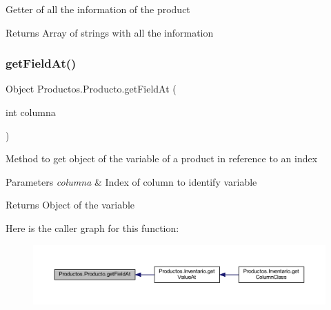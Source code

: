Getter of all the information of the product

\begin{DoxyReturn}{Returns}
Array of strings with all the information 
\end{DoxyReturn}
\mbox{\label{class_productos_1_1_producto_a2a39275df7fbbf26f2173b760d0d4ba9}} 
\subsubsection{\texorpdfstring{get\+Field\+At()}{getFieldAt()}}
{\footnotesize\ttfamily Object Productos.\+Producto.\+get\+Field\+At (\begin{DoxyParamCaption}\item[{int}]{columna }\end{DoxyParamCaption})}

Method to get object of the variable of a product in reference to an index


\begin{DoxyParams}{Parameters}
{\em columna} & Index of column to identify variable \\
\hline
\end{DoxyParams}
\begin{DoxyReturn}{Returns}
Object of the variable 
\end{DoxyReturn}
Here is the caller graph for this function\+:
\nopagebreak
\begin{figure}[H]
\begin{center}
\leavevmode
\includegraphics[width=350pt]{class_productos_1_1_producto_a2a39275df7fbbf26f2173b760d0d4ba9_icgraph}
\end{center}
\end{figure}
\mbox{\label{class_productos_1_1_producto_ae853d92d3cf87463dc31c6c9033e4f23}} 
